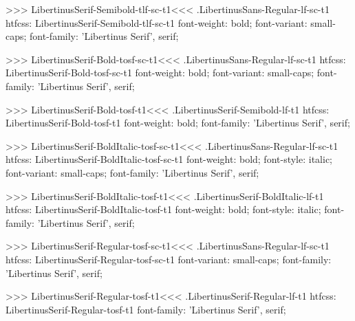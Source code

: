{{{{>>>
\<LibertinusSerif-Semibold-tlf-sc-t1\><<<
.LibertinusSans-Regular-lf-sc-t1
htfcss:  LibertinusSerif-Semibold-tlf-sc-t1  font-weight: bold; font-variant: small-caps; font-family: 'Libertinus Serif', serif;

>>>
\<LibertinusSerif-Bold-tosf-sc-t1\><<<
.LibertinusSans-Regular-lf-sc-t1
htfcss:  LibertinusSerif-Bold-tosf-sc-t1  font-weight: bold; font-variant: small-caps; font-family: 'Libertinus Serif', serif;

>>>
\<LibertinusSerif-Bold-tosf-t1\><<<
.LibertinusSerif-Semibold-lf-t1
htfcss:  LibertinusSerif-Bold-tosf-t1  font-weight: bold; font-family: 'Libertinus Serif', serif;

>>>
\<LibertinusSerif-BoldItalic-tosf-sc-t1\><<<
.LibertinusSans-Regular-lf-sc-t1
htfcss:  LibertinusSerif-BoldItalic-tosf-sc-t1  font-weight: bold; font-style: italic; font-variant: small-caps; font-family: 'Libertinus Serif', serif;

>>>
\<LibertinusSerif-BoldItalic-tosf-t1\><<<
.LibertinusSerif-BoldItalic-lf-t1
htfcss:  LibertinusSerif-BoldItalic-tosf-t1  font-weight: bold; font-style: italic; font-family: 'Libertinus Serif', serif;

>>>
\<LibertinusSerif-Regular-tosf-sc-t1\><<<
.LibertinusSans-Regular-lf-sc-t1
htfcss:  LibertinusSerif-Regular-tosf-sc-t1  font-variant: small-caps; font-family: 'Libertinus Serif', serif;

>>>
\<LibertinusSerif-Regular-tosf-t1\><<<
.LibertinusSerif-Regular-lf-t1
htfcss:  LibertinusSerif-Regular-tosf-t1  font-family: 'Libertinus Serif', serif;

}}}}
